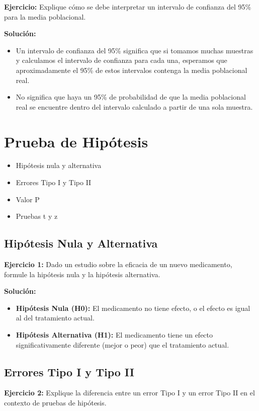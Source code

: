 \documentclass{article}
\begin{document}
\textbf{Ejercicio:} Explique cómo se debe interpretar un intervalo de confianza del 95\% para la media poblacional.

\textbf{Solución:}
\begin{itemize}
    \item Un intervalo de confianza del 95\% significa que si tomamos muchas muestras y calculamos el intervalo de confianza para cada una, esperamos que aproximadamente el 95\% de estos intervalos contenga la media poblacional real.
    \item No significa que haya un 95\% de probabilidad de que la media poblacional real se encuentre dentro del intervalo calculado a partir de una sola muestra.
\end{itemize}

\section{Prueba de Hipótesis}
\begin{itemize}
    \item Hipótesis nula y alternativa
    \item Errores Tipo I y Tipo II
    \item Valor P
    \item Pruebas t y z
\end{itemize}


\subsection{Hipótesis Nula y Alternativa}

\textbf{Ejercicio 1:} Dado un estudio sobre la eficacia de un nuevo medicamento, formule la hipótesis nula y la hipótesis alternativa.

\textbf{Solución:}
\begin{itemize}
    \item \textbf{Hipótesis Nula (H0):} El medicamento no tiene efecto, o el efecto es igual al del tratamiento actual.
    \item \textbf{Hipótesis Alternativa (H1):} El medicamento tiene un efecto significativamente diferente (mejor o peor) que el tratamiento actual.
\end{itemize}

\subsection{Errores Tipo I y Tipo II}

\textbf{Ejercicio 2:} Explique la diferencia entre un error Tipo I y un error Tipo II en el contexto de pruebas de hipótesis.
\end{document}
